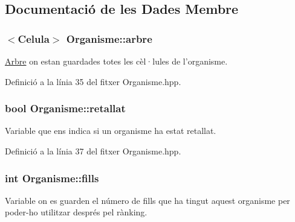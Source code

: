 \subsection{Documentació de les Dades Membre}
\hypertarget{class_organisme_aa6bc89f1937afd04f86e770c2bde8c69}{
\subsubsection[{arbre}]{$<${\bf Celula}$>$ Organisme\-::arbre\hspace{0.3cm}{\ttfamily [private]}}}\label{class_organisme_aa6bc89f1937afd04f86e770c2bde8c69}


\hyperlink{class_arbre}{Arbre} on estan guardades totes les cèl·lules de l'organisme. 



Definició a la línia 35 del fitxer Organisme.\-hpp.

\hypertarget{class_organisme_acf912225a83570cb68542dcc6709023a}{
\subsubsection[{retallat}]{\setlength{\rightskip}{0pt plus 5cm}bool Organisme\-::retallat\hspace{0.3cm}{\ttfamily [private]}}}\label{class_organisme_acf912225a83570cb68542dcc6709023a}


Variable que ens indica si un organisme ha estat retallat. 



Definició a la línia 37 del fitxer Organisme.\-hpp.

\hypertarget{class_organisme_a4644da413bb0e38f34566334ebee1c1c}{
\subsubsection[{fills}]{\setlength{\rightskip}{0pt plus 5cm}int Organisme\-::fills\hspace{0.3cm}{\ttfamily [private]}}}\label{class_organisme_a4644da413bb0e38f34566334ebee1c1c}


Variable on es guarden el número de fills que ha tingut aquest organisme per poder-\/ho utilitzar després pel rànking. 



